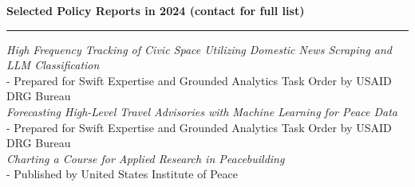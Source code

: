 \documentclass[11pt]{article}
\begin{document}
\textbf{\large Selected Policy Reports in 2024 (contact for full list)}\\
\rule[3mm]{\textwidth}{.2pt}\vspace{-5pt}
{\sl High Frequency Tracking of Civic Space Utilizing Domestic News Scraping and LLM Classification}\\
- Prepared for Swift Expertise and Grounded Analytics Task Order by USAID DRG Bureau\\
{\sl Forecasting High-Level Travel Advisories with Machine Learning for Peace Data}\\
- Prepared for Swift Expertise and Grounded Analytics Task Order by USAID DRG Bureau\\
{\sl Charting a Course for Applied Research in Peacebuilding}\\
- Published by United States Institute of Peace






% 
% 
% 
% 
% 
% 
% 
\end{document}
